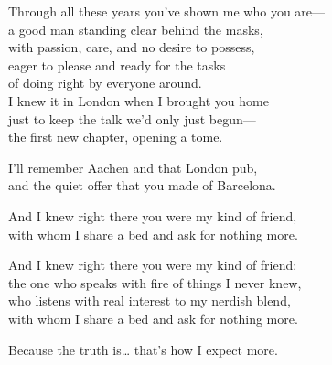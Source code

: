 \begin{lyrics}
Through all these years you’ve shown me who you are—\\
a good man standing clear behind the masks,\\
with passion, care, and no desire to possess,\\
eager to please and ready for the tasks\\
of doing right by everyone around.\\
I knew it in London when I brought you home\\
just to keep the talk we’d only just begun—\\
the first new chapter, opening a tome.

I’ll remember Aachen and that London pub,\\
and the quiet offer that you made of Barcelona.

And I knew right there you were my kind of friend,\\
with whom I share a bed and ask for nothing more.

And I knew right there you were my kind of friend:\\
the one who speaks with fire of things I never knew,\\
who listens with real interest to my nerdish blend,\\
with whom I share a bed and ask for nothing more.

Because the truth is… that’s how I expect more.
\end{lyrics}

